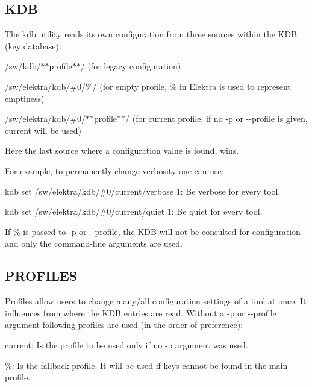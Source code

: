 \subsection*{K\+DB}

The {\ttfamily kdb} utility reads its own configuration from three sources within the K\+DB (key database)\+:


\begin{DoxyEnumerate}
\item /sw/kdb/$\ast$$\ast$profile$\ast$$\ast$/ (for legacy configuration)
\item /sw/elektra/kdb/\#0/\%/ (for empty profile, {\ttfamily \%} in Elektra is used to represent emptiness)
\item /sw/elektra/kdb/\#0/$\ast$$\ast$profile$\ast$$\ast$/ (for current profile, if no {\ttfamily -\/p} or {\ttfamily -\/-\/profile} is given, {\ttfamily current} will be used)
\end{DoxyEnumerate}

Here the last source where a configuration value is found, wins.

For example, to permanently change verbosity one can use\+:


\begin{DoxyItemize}
\item {\ttfamily kdb set /sw/elektra/kdb/\#0/current/verbose 1}\+: Be verbose for every tool.
\item {\ttfamily kdb set /sw/elektra/kdb/\#0/current/quiet 1}\+: Be quiet for every tool.
\end{DoxyItemize}

If {\ttfamily \%} is passed to {\ttfamily -\/p} or {\ttfamily -\/-\/profile}, the K\+DB will not be consulted for configuration and only the command-\/line arguments are used.

\subsection*{P\+R\+O\+F\+I\+L\+ES}

Profiles allow users to change many/all configuration settings of a tool at once. It influences from where the K\+DB entries are read. Without a {\ttfamily -\/p} or {\ttfamily -\/-\/profile} argument following profiles are used (in the order of preference)\+:


\begin{DoxyItemize}
\item {\ttfamily current}\+: Is the profile to be used only if no {\ttfamily -\/p} argument was used.
\item {\ttfamily \%}\+: Is the fallback profile. It will be used if keys cannot be found in the main profile.
\end{DoxyItemize}

